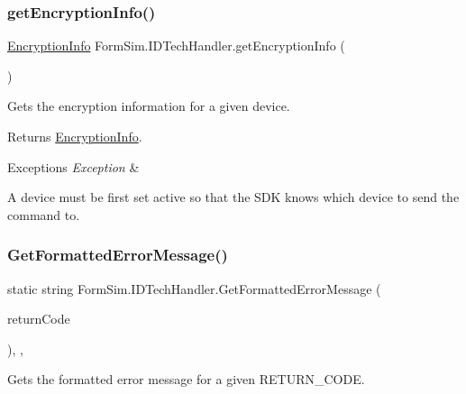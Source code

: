 \subsubsection{\texorpdfstring{get\+Encryption\+Info()}{getEncryptionInfo()}}
{\footnotesize\ttfamily \mbox{\hyperlink{class_form_sim_1_1_encryption_info}{Encryption\+Info}} Form\+Sim.\+I\+D\+Tech\+Handler.\+get\+Encryption\+Info (\begin{DoxyParamCaption}{ }\end{DoxyParamCaption})\hspace{0.3cm}{\ttfamily [inline]}}



Gets the encryption information for a given device. 

\begin{DoxyReturn}{Returns}
\mbox{\hyperlink{class_form_sim_1_1_encryption_info}{Encryption\+Info}}.
\end{DoxyReturn}

\begin{DoxyExceptions}{Exceptions}
{\em Exception} & \\
\hline
\end{DoxyExceptions}


A device must be first set active so that the S\+DK knows which device to send the command to. \mbox{\label{class_form_sim_1_1_i_d_tech_handler_a96e8dc0e78ffc3eed274ec450fd9d272}} 
\subsubsection{\texorpdfstring{Get\+Formatted\+Error\+Message()}{GetFormattedErrorMessage()}}
{\footnotesize\ttfamily static string Form\+Sim.\+I\+D\+Tech\+Handler.\+Get\+Formatted\+Error\+Message (\begin{DoxyParamCaption}\item[{R\+E\+T\+U\+R\+N\+\_\+\+C\+O\+DE}]{return\+Code }\end{DoxyParamCaption})\hspace{0.3cm}{\ttfamily [inline]}, {\ttfamily [static]}, {\ttfamily [private]}}



Gets the formatted error message for a given R\+E\+T\+U\+R\+N\+\_\+\+C\+O\+DE. 


